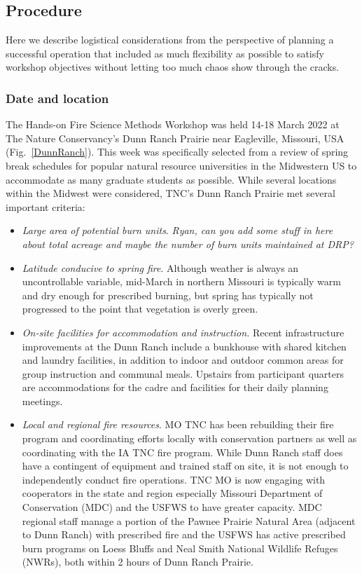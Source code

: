 \documentclass[fire,article,submit,moreauthors,pdftex]{Definitions/mdpi}
\begin{document}
\subsection{Procedure}

Here we describe logistical considerations from the perspective of planning a successful operation that included as much flexibility as possible to satisfy workshop objectives without letting too much chaos show through the cracks.

\subsubsection{Date and location}

The Hands-on Fire Science Methods Workshop was held 14-18 March 2022 at The Nature Conservancy's Dunn Ranch Prairie near Eagleville, Missouri, USA (Fig.~\ref{DunnRanch}).
This week was specifically selected from a review of spring break schedules for popular natural resource universities in the Midwestern US to accommodate as many graduate students as possible.
While several locations within the Midwest were considered, TNC's Dunn Ranch Prairie met several important criteria:

\begin{itemize}
\item
  \emph{Large area of potential burn units}. \emph{Ryan, can you add some stuff in here about total acreage and maybe the number of burn units maintained at DRP?}
\item
  \emph{Latitude conducive to spring fire}.
  Although weather is always an uncontrollable variable, mid-March in northern Missouri is typically warm and dry enough for prescribed burning, but spring has typically not progressed to the point that vegetation is overly green.
\item
  \emph{On-site facilities for accommodation and instruction.}
  Recent infrastructure improvements at the Dunn Ranch include a bunkhouse with shared kitchen and laundry facilities, in addition to indoor and outdoor common areas for group instruction and communal meals.
  Upstairs from participant quarters are accommodations for the cadre and facilities for their daily planning meetings.
\item
  \emph{Local and regional fire resources}.
  MO TNC has been rebuilding their fire program and coordinating efforts locally with conservation partners as well as coordinating with the IA TNC fire program. 
  While Dunn Ranch staff does have a contingent of equipment and trained staff on site, it is not enough to independently conduct fire operations.
  TNC MO is now engaging with cooperators in the state and region especially Missouri Department of Conservation (MDC) and the USFWS to have greater capacity.
  MDC regional staff manage a portion of the Pawnee Prairie Natural Area (adjacent to Dunn Ranch) with prescribed fire and the USFWS has active prescribed burn programs on Loess Bluffs and Neal Smith National Wildlife Refuges (NWRs), both within 2 hours of Dunn Ranch Prairie. 
  
\end{itemize}
\end{document}
